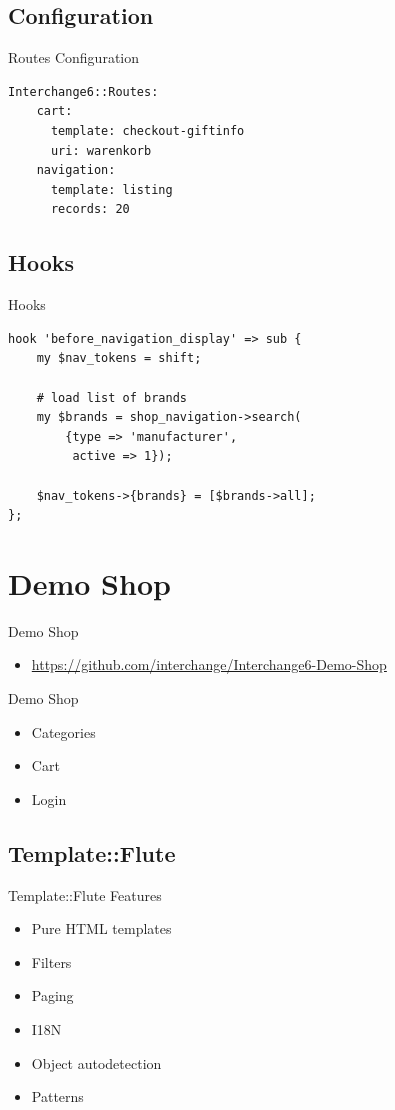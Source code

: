 \subsection{Configuration}
\begin{frame}[fragile]{Routes Configuration}
\begin{lstlisting}
Interchange6::Routes:
    cart:
      template: checkout-giftinfo
      uri: warenkorb
    navigation:
      template: listing
      records: 20
\end{lstlisting}
\end{frame}

\subsection{Hooks}
\begin{frame}[fragile]{Hooks}
\begin{lstlisting}
hook 'before_navigation_display' => sub {
    my $nav_tokens = shift;

    # load list of brands
    my $brands = shop_navigation->search(
        {type => 'manufacturer',
         active => 1});

    $nav_tokens->{brands} = [$brands->all];
};
\end{lstlisting}
\end{frame}

\section{Demo Shop}
\begin{frame}{Demo Shop}
\begin{itemize}
\item  \url{https://github.com/interchange/Interchange6-Demo-Shop}
\end{itemize}
\end{frame}

\begin{frame}{Demo Shop}
\begin{itemize}
\item Categories
\item Cart
\item Login
\end{itemize}
\end{frame}

\subsection{Template::Flute}
\begin{frame}{Template::Flute Features}
\begin{itemize}
\item Pure HTML templates
\item Filters
\item Paging
\item I18N
\item Object autodetection
\item Patterns
\end{itemize}
\end{frame}

